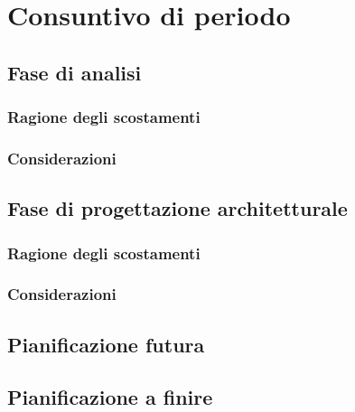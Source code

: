 \section{Consuntivo di periodo} \label{consuntivo_di_periodo}

\subsection{Fase di analisi}
\subsubsection{Ragione degli scostamenti}
\subsubsection{Considerazioni}


\subsection{Fase di progettazione architetturale}
\subsubsection{Ragione degli scostamenti}
\subsubsection{Considerazioni}


\subsection{Pianificazione futura}


\subsection{Pianificazione a finire}
